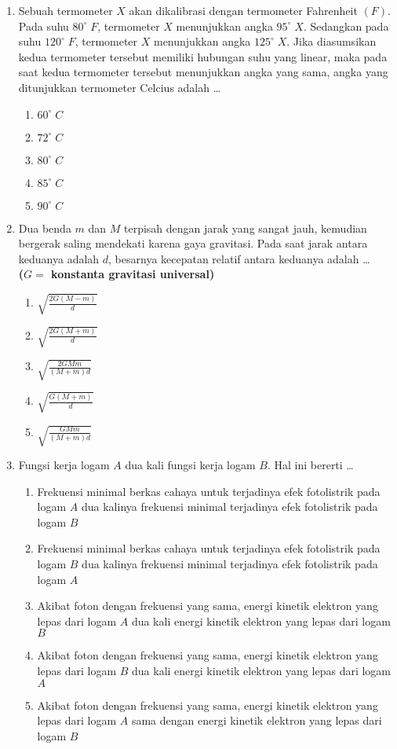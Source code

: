 \documentclass[A4,12PT, english, twocolumn]{journal}
\begin{document}
\begin{enumerate}
\item Sebuah termometer $X$ akan dikalibrasi dengan termometer Fahrenheit $(F)$. Pada suhu $80^\circ \; F$, termometer $X$ menunjukkan angka $95^\circ \; X$. Sedangkan pada suhu $120^\circ \; F$, termometer $X$ menunjukkan angka $125^\circ \; X$. Jika diasumsikan kedua termometer tersebut memiliki hubungan suhu yang linear, maka pada saat kedua termometer tersebut menunjukkan angka yang sama, angka yang ditunjukkan termometer Celcius adalah \dots
    \begin{enumerate}
        \item $60^\circ \; C$
        \item $72^\circ \; C$
        \item $80^\circ \; C$
        \item $85^\circ \; C$
        \item $90^\circ \; C$
    \end{enumerate}

\item Dua benda $m$ dan $M$ terpisah dengan jarak yang sangat jauh, kemudian bergerak saling mendekati karena gaya gravitasi. Pada saat jarak antara keduanya adalah $d$, besarnya kecepatan relatif antara keduanya adalah \dots \\
\textbf{($G=$ konstanta gravitasi universal)}
    \begin{enumerate}
        \item $\sqrt{\frac{2G(M-m)}{d}}$
        \item $\sqrt{\frac{2G(M+m)}{d}}$
        \item $\sqrt{\frac{2GMm}{(M+m)d}}$
        \item $\sqrt{\frac{G(M+m)}{d}}$
        \item $\sqrt{\frac{GMm}{(M+m)d}}$
    \end{enumerate}

\item Fungsi kerja logam $A$ dua kali fungsi kerja logam $B$. Hal ini bererti \dots
    \begin{enumerate}
        \item Frekuensi minimal berkas cahaya untuk terjadinya efek fotolistrik pada logam $A$ dua kalinya frekuensi minimal terjadinya efek fotolistrik pada logam $B$
        \item Frekuensi minimal berkas cahaya untuk terjadinya efek fotolistrik pada logam $B$ dua kalinya frekuensi minimal terjadinya efek fotolistrik pada logam $A$
        \item Akibat foton dengan frekuensi yang sama, energi kinetik elektron yang lepas dari logam $A$ dua kali energi kinetik elektron yang lepas dari logam $B$
        \item Akibat foton dengan frekuensi yang sama, energi kinetik elektron yang lepas dari logam $B$ dua kali energi kinetik elektron yang lepas dari logam $A$
        \item Akibat foton dengan frekuensi yang sama, energi kinetik elektron yang lepas dari logam $A$ sama dengan energi kinetik elektron yang lepas dari logam $B$
    \end{enumerate}
 

\end{enumerate}
\end{document}
